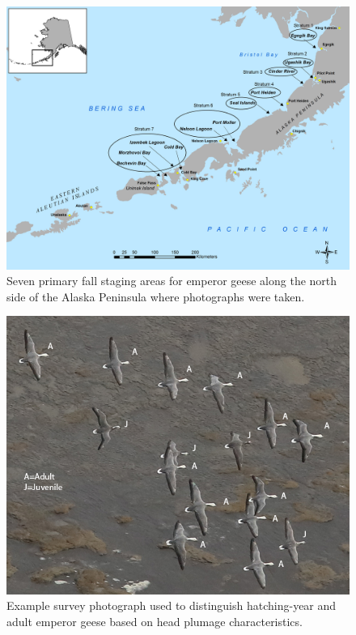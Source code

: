 \documentclass[]{article}
\begin{document}
\begin{figure}[h]
\includegraphics{figure_1_lagoon_map_300dpi.jpg}
\caption{Seven primary fall staging areas for emperor geese along the north side of the Alaska Peninsula where photographs were taken.}
\end{figure}

\begin{figure}[h] 
\includegraphics{IMG_8554_anno.jpg}
\caption{Example survey photograph used to distinguish hatching-year and adult emperor geese based on head plumage characteristics.}
\end{figure}
\end{document}
